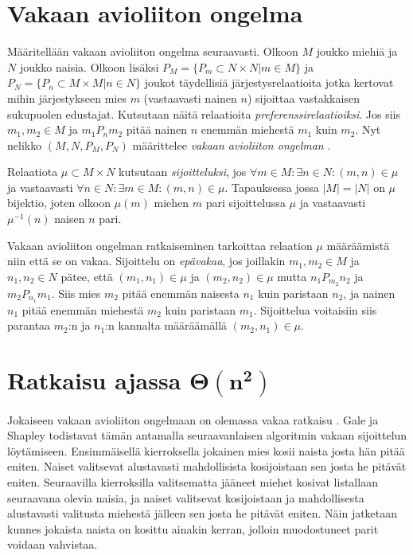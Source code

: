 \documentclass[gradu, twoside]{tktltiki}
\begin{document}
\section{Vakaan avioliiton ongelma}

Määritellään vakaan avioliiton ongelma seuraavasti. Olkoon $M$ joukko
miehiä ja $N$ joukko naisia. Olkoon lisäksi $P_M = \{P_m \subset N
\times N | m \in M\}$ ja $P_N = \{P_n \subset M \times M | n \in N\}$
joukot täydellisiä järjestysrelaatioita jotka kertovat mihin
järjestykseen mies $m$ (vastaavasti nainen $n$) sijoittaa vastakkaisen
sukupuolen edustajat. Kutsutaan näitä relaatioita
\emph{preferenssirelaatioiksi}. Jos siis $m_1,m_2 \in M$ ja
$m_1P_nm_2$ pitää nainen $n$ enemmän miehestä $m_1$ kuin $m_2$. Nyt
nelikko $(M, N, P_M, P_N)$ määrittelee \emph{vakaan avioliiton
  ongelman }.

Relaatiota $\mu \subset M \times N$ kutsutaan \emph{sijoitteluksi},
jos $\forall m \in M: \exists n \in N: (m, n) \in \mu$ ja vastaavasti
$\forall n \in N: \exists m \in M: (m, n) \in \mu$. Tapauksessa jossa
$|M| = |N|$ on $\mu$ bijektio, joten olkoon $\mu(m)$ miehen $m$ pari
sijoittelussa $\mu$ ja vastaavasti $\mu^{-1}(n)$ naisen $n$ pari.

Vakaan avioliiton ongelman ratkaiseminen tarkoittaa relaation $\mu$
määräämistä niin että se on vakaa. Sijoittelu on \emph{epävakaa}, jos
joillakin $m_1, m_2 \in M$ ja $n_1, n_2 \in N$ pätee, että $(m_1, n_1)
\in \mu$ ja $(m_2, n_2) \in \mu$ mutta $n_1P_{m_2}n_2$ ja
$m_2P_{n_1}m_1$. Siis mies $m_2$ pitää enemmän naisesta $n_1$ kuin
paristaan $n_2$, ja nainen $n_1$ pitää enemmän miehestä $m_2$ kuin
paristaan $m_1$. Sijoittelua voitaisiin siis parantaa $m_2$:n ja
$n_1$:n kannalta määräämällä $(m_2, n_1) \in \mu$.

\section{Ratkaisu ajassa $\boldsymbol{\Theta(n^2)}$}

Jokaiseen vakaan avioliiton ongelmaan on olemassa vakaa ratkaisu
\cite{galeshapley62}. Gale ja Shapley todistavat tämän antamalla
seuraavanlaisen algoritmin vakaan sijoittelun löytämiseen.
Ensimmäisellä kierroksella jokainen mies kosii naista josta hän pitää
eniten. Naiset valitsevat alustavasti mahdollisista kosijoistaan sen
josta he pitävät eniten. Seuraavilla kierroksilla valitsematta jääneet
miehet kosivat listallaan seuraavana olevia naisia, ja naiset
valitsevat kosijoistaan ja mahdollisesta alustavasti valitusta
miehestä jälleen sen josta he pitävät eniten. Näin jatketaan kunnes
jokaista naista on kosittu ainakin kerran, jolloin muodostuneet parit
voidaan vahvistaa.
\end{document}

